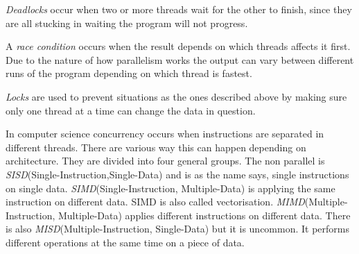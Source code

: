 \documentclass[10pt,a4paper]{report}
\begin{document}


\emph{Deadlocks} occur when two or more threads wait for the other to finish, since they are all stucking in waiting the program will not progress.

A \emph{race condition} occurs when the result depends on which threads affects it first. Due to the nature of how parallelism works the output can vary between different runs of the program depending on which thread is fastest.

\emph{Locks} are used to prevent situations as the ones described above by making sure only one thread at a time can change the data in question.

In computer science concurrency occurs when instructions are separated in different threads. There are various way this can happen depending on architecture. They are divided into four general groups. The non parallel is \emph{SISD}(Single-Instruction,Single-Data) and is as the name says, single instructions on single data.
\emph{SIMD}(Single-Instruction, Multiple-Data) is applying the same instruction on different data. SIMD is also called vectorisation.
\emph{MIMD}(Multiple-Instruction, Multiple-Data) applies different instructions on different data. There is also \emph{MISD}(Multiple-Instruction, Single-Data) but it is uncommon. It performs different operations at the same time on a piece of data.
\end{document}
